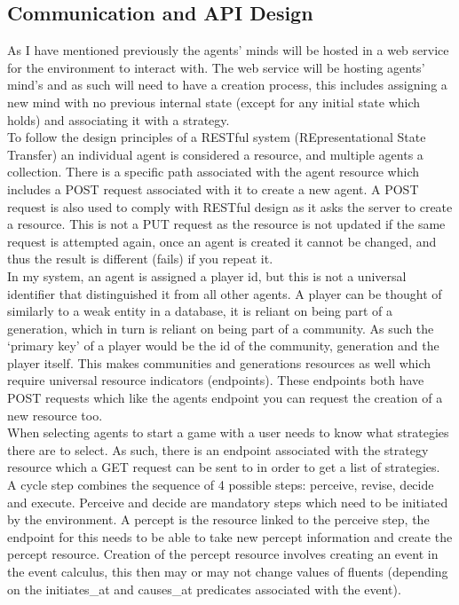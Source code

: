 \documentclass[twoside,twocolumn]{article}
\begin{document}
\subsection{Communication and API Design}
As I have mentioned previously the agents' minds will be hosted in a web service for the environment to interact with. The web service will be hosting agents' mind's and as such will need to have a creation process, this includes assigning a new mind with no previous internal state (except for any initial state which holds) and associating it with a strategy.\\
To follow the design principles of a RESTful system (REpresentational State Transfer) an individual agent is considered a resource, and multiple agents a collection. There is a specific path associated with the agent resource which includes a POST request associated with it to create a new agent. A POST request is also used to comply with RESTful design as it asks the server to create a resource. This is not a PUT request as the resource is not updated if the same request is attempted again, once an agent is created it cannot be changed, and thus the result is different (fails) if you repeat it.\\
In my system, an agent is assigned a player id, but this is not a universal identifier that distinguished it from all other agents. A player can be thought of similarly to a weak entity in a database, it is reliant on being part of a generation, which in turn is reliant on being part of a community. As such the `primary key' of a player would be the id of the community, generation and the player itself. This makes communities and generations resources as well which require universal resource indicators (endpoints). These endpoints both have POST requests which like the agents endpoint you can request the creation of a new resource too.\\
When selecting agents to start a game with a user needs to know what strategies there are to select. As such, there is an endpoint associated with the strategy resource which a GET request can be sent to in order to get a list of strategies.\\
A cycle step combines the sequence of 4 possible steps: perceive, revise, decide and execute. Perceive and decide are mandatory steps which need to be initiated by the environment. A percept is the resource linked to the perceive step, the endpoint for this needs to be able to take new percept information and create the percept resource. Creation of the percept resource involves creating an event in the event calculus, this then may or may not change values of fluents (depending on the initiates\_at and causes\_at predicates associated with the event).\\
\end{document}
